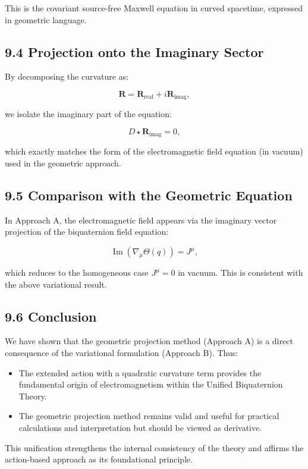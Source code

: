 This is the covariant source-free Maxwell equation in curved spacetime, expressed in geometric language.

\subsection*{9.4 Projection onto the Imaginary Sector}

By decomposing the curvature as:

\[
\mathbf{R} = \mathbf{R}_{\text{real}} + i \mathbf{R}_{\text{imag}},
\]

we isolate the imaginary part of the equation:

\[
D \star \mathbf{R}_{\text{imag}} = 0,
\]

which exactly matches the form of the electromagnetic field equation (in vacuum) used in the geometric approach.

\subsection*{9.5 Comparison with the Geometric Equation}

In Approach A, the electromagnetic field appears via the imaginary vector projection of the biquaternion field equation:

\[
\operatorname{Im}(\nabla_\mu \Theta(q)) = J^\mu,
\]

which reduces to the homogeneous case \( J^\mu = 0 \) in vacuum. This is consistent with the above variational result.

\subsection*{9.6 Conclusion}

We have shown that the geometric projection method (Approach A) is a direct consequence of the variational formulation (Approach B). Thus:

\begin{itemize}
  \item The extended action with a quadratic curvature term provides the fundamental origin of electromagnetism within the Unified Biquaternion Theory.
  \item The geometric projection method remains valid and useful for practical calculations and interpretation but should be viewed as derivative.
\end{itemize}

This unification strengthens the internal consistency of the theory and affirms the action-based approach as its foundational principle.
